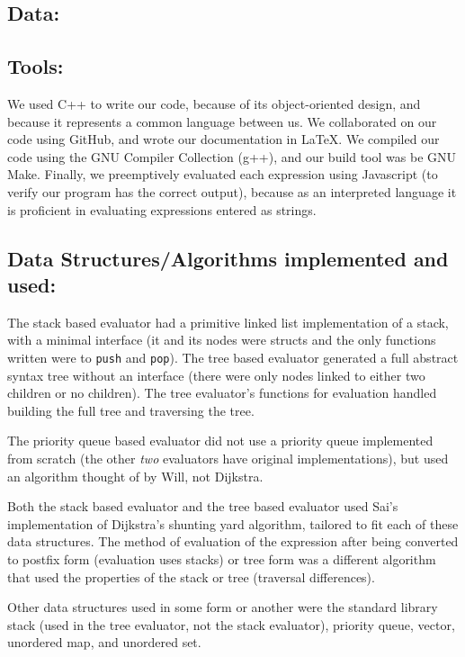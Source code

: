 \documentclass[11pt]{article}
\begin{document}
\subsection*{Data:}

\subsection*{Tools:}
We used C++ to write our code, because of its object-oriented design, and because it represents a common language between us.
We collaborated on our code using GitHub, and wrote our documentation in \LaTeX.
We compiled our code using the GNU Compiler Collection (g++), and our build tool was be GNU Make.
Finally, we preemptively evaluated each expression using Javascript (to verify our program has the correct output), because as an interpreted language it is proficient in evaluating expressions entered as strings.

\subsection*{Data Structures/Algorithms implemented and used:}
The stack based evaluator had a primitive linked list implementation of a stack, with a minimal interface (it and its nodes were structs and the only functions written were to \texttt{push} and \texttt{pop}).
The tree based evaluator generated a full abstract syntax tree without an interface (there were only nodes linked to either two children or no children).
The tree evaluator's functions for evaluation handled building the full tree and traversing the tree.

The priority queue based evaluator did not use a priority queue implemented from scratch (the other \textit{two} evaluators have original implementations), but used an algorithm thought of by Will, not Dijkstra.

Both the stack based evaluator and the tree based evaluator used Sai's implementation of Dijkstra's shunting yard algorithm, tailored to fit each of these data structures.
The method of evaluation of the expression after being converted to postfix form (evaluation uses stacks) or tree form was a different algorithm that used the properties of the stack or tree (traversal differences).

Other data structures used in some form or another were the standard library stack (used in the tree evaluator, not the stack evaluator), priority queue, vector, unordered map, and unordered set.
\end{document}
